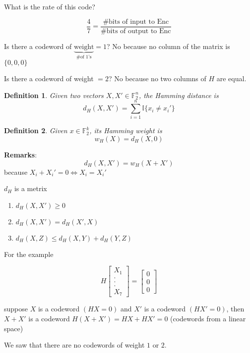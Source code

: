 \documentclass[twoside]{article}
\newtheorem{definition}{Definition}[section]
\theoremstyle{definition} %
\def\F{\mathbb{F}}
\def\I{\mathbb{I}}
\begin{document}
What is the rate of this code?

\[
  \frac{4}{7} = \frac{\# \text{bits of input to Enc}}{\# \text{bits of output to Enc}}
\]

Is there a codeword of $\underbrace{\text{weight}}_{\# \text{of 1's}} = 1$?
No because no column of the matrix is $\{0, 0, 0\}$

Is there a codeword of weight $= 2$? No because no two columns of $H$ are equal.

\begin{definition}
  Given two vectors $X, X' \in \F^n_2$, the Hamming distance is
  \[
    d_H(X, X') = \sum_{i = 1}^n \I\{ x_i \neq x_i'\}
  \]
\end{definition}

\begin{definition}
  Given $x \in \F_2^k$, its Hamming weight is
  \[
    w_H(X) = d_H(X, 0)
  \]
\end{definition}

\textbf{Remarks}: \\
\[
  d_H(X, X') = w_H(X + X')
\]
because $X_i + X_i' = 0 \Leftrightarrow X_i = X_i'$

$d_H$ is a metrix
\begin{enumerate}
  \item $d_H(X, X') \geq 0$ \\
  \item $d_H(X, X') = d_H(X', X)$
  \item $d_H(X, Z) \leq d_H(X, Y) + d_H(Y, Z)$
\end{enumerate}

For the example

\[
  H
  \left[
    \begin{array}{c}
      X_1 \\
      . \\
      . \\
      . \\
      X_7
    \end{array}
  \right]
  =
  \left[
    \begin{array}{c}
      0 \\
      0 \\
      0
    \end{array}
  \right]
\]

suppose $X$ is a codeword $(HX = 0)$ and $X'$ is a codeword $(H X' = 0)$, then $X + X'$ is a codeword $H(X+ X') = HX + HX' = 0$ (codewords from a linear space)

We saw that there are no codewords of weight $1$ or $2$.
\end{document}
